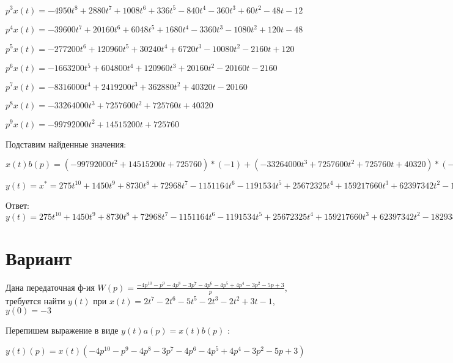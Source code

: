 \documentclass{article}
\begin{document}
{{{{{$p^3x(t)=-4950t^{8}+2880t^{7}+1008t^{6}+336t^{5}-840t^{4}-360t^{3}+60t^{2}-48t-12$

$p^4x(t)=-39600t^{7}+20160t^{6}+6048t^{5}+1680t^{4}-3360t^{3}-1080t^{2}+120t-48$

$p^5x(t)=-277200t^{6}+120960t^{5}+30240t^{4}+6720t^{3}-10080t^{2}-2160t+120$

$p^6x(t)=-1663200t^{5}+604800t^{4}+120960t^{3}+20160t^{2}-20160t-2160$

$p^7x(t)=-8316000t^{4}+2419200t^{3}+362880t^{2}+40320t-20160$

$p^8x(t)=-33264000t^{3}+7257600t^{2}+725760t+40320$

$p^9x(t)=-99792000t^{2}+14515200t+725760$

Подставим найденные значения:

$x(t)b(p) = (-99792000t^{2}+14515200t+725760)*(-1)+(-33264000t^{3}+7257600t^{2}+725760t+40320)*(-5)+(-8316000t^{4}+2419200t^{3}+362880t^{2}+40320t-20160)*(-3)+(-1663200t^{5}+604800t^{4}+120960t^{3}+20160t^{2}-20160t-2160)*1+(-277200t^{6}+120960t^{5}+30240t^{4}+6720t^{3}-10080t^{2}-2160t+120)*4+(-39600t^{7}+20160t^{6}+6048t^{5}+1680t^{4}-3360t^{3}-1080t^{2}+120t-48)*(-2)+(-4950t^{8}+2880t^{7}+1008t^{6}+336t^{5}-840t^{4}-360t^{3}+60t^{2}-48t-12)*(-2)+(-550t^{9}+360t^{8}+144t^{7}+56t^{6}-168t^{5}-90t^{4}+20t^{3}-24t^{2}-12t-2)*(-3)+(-55t^{10}+40t^{9}+18t^{8}+8t^{7}-28t^{6}-18t^{5}+5t^{4}-8t^{3}-6t^{2}-2t)*(-5)=275t^{10}+1450t^{9}+8730t^{8}+72968t^{7}-1151164t^{6}-1191534t^{5}+25672325t^{4}+159217660t^{3}+62397342t^{2}-18293858t$





$y(t)=x^*=275t^{10}+1450t^{9}+8730t^{8}+72968t^{7}-1151164t^{6}-1191534t^{5}+25672325t^{4}+159217660t^{3}+62397342t^{2}-18293858t$

Ответ: $y(t) = 275t^{10}+1450t^{9}+8730t^{8}+72968t^{7}-1151164t^{6}-1191534t^{5}+25672325t^{4}+159217660t^{3}+62397342t^{2}-18293858t$

\section{Вариант}

Дана передаточная ф-ия $W(p)=\frac{-4p^{10}-p^{9}-4p^{8}-3p^{7}-4p^{6}-4p^{5}+4p^{4}-3p^{2}-5p+3}{p}$, требуется найти $y(t)$ при $x(t)=2t^{7}-2t^{6}-5t^{5}-2t^{3}-2t^{2}+3t-1$, $y(0)=-3$

Перепишем выражение в виде $y(t)a(p)=x(t)b(p)$ :

$y(t)(p)=x(t)(-4p^{10}-p^{9}-4p^{8}-3p^{7}-4p^{6}-4p^{5}+4p^{4}-3p^{2}-5p+3)$

}}}}}
\end{document}
